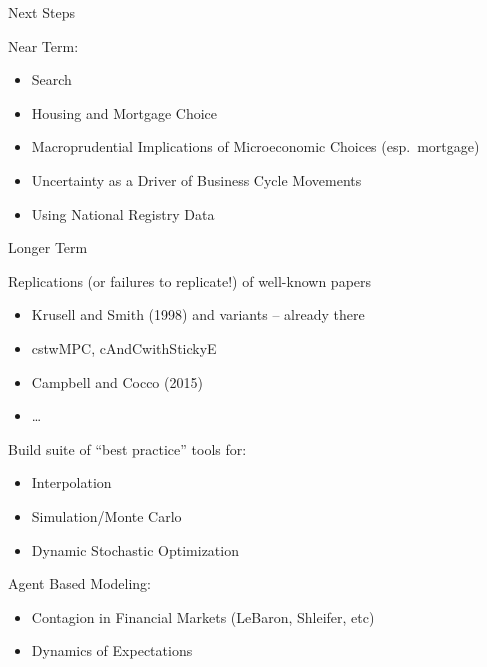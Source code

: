 \begin{frame}{%
\protect\hypertarget{next-steps}{%
Next Steps}}

Near Term:

\begin{itemize}
\tightlist
\item
  Search
\item
  Housing and Mortgage Choice
\item
  Macroprudential Implications of Microeconomic Choices (esp.~mortgage)
\item
  Uncertainty as a Driver of Business Cycle Movements
\item
  Using National Registry Data
\end{itemize}

\end{frame}

\begin{frame}{%
\protect\hypertarget{longer-term}{%
Longer Term}}

Replications (or failures to replicate!) of well-known papers

\begin{itemize}
\tightlist
\item
  Krusell and Smith (1998) and variants – already there
\item
  cstwMPC, cAndCwithStickyE
\item
  Campbell and Cocco (2015)
\item
  \ldots{}
\end{itemize}

\pause

Build suite of “best practice” tools for:

\begin{itemize}
\tightlist
\item
  Interpolation
\item
  Simulation/Monte Carlo
\item
  Dynamic Stochastic Optimization
\end{itemize}

\pause

Agent Based Modeling:

\begin{itemize}
\tightlist
\item
  Contagion in Financial Markets (LeBaron, Shleifer, etc)
\item
  Dynamics of Expectations
\end{itemize}

\end{frame}

